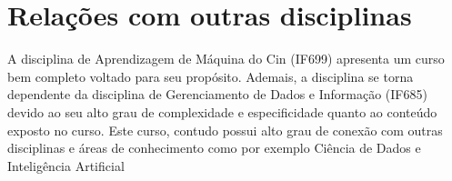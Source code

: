 \documentclass[12pt]{article}
\begin{document}
\cite{mahesh2020machine}
\cite{monard2003conceitos}


\section{Relações com outras disciplinas}
\par
A disciplina de Aprendizagem de Máquina do Cin (IF699) apresenta um curso bem completo voltado para seu propósito. Ademais, a disciplina se torna dependente da disciplina de Gerenciamento de Dados e Informação (IF685) devido ao seu alto grau de complexidade e especificidade quanto ao conteúdo exposto no curso. Este curso, contudo possui alto grau de conexão com outras disciplinas e áreas de conhecimento como por exemplo Ciência de Dados e Inteligência Artificial
\cite{de2020smart}

\printbibliography
\end{document}
